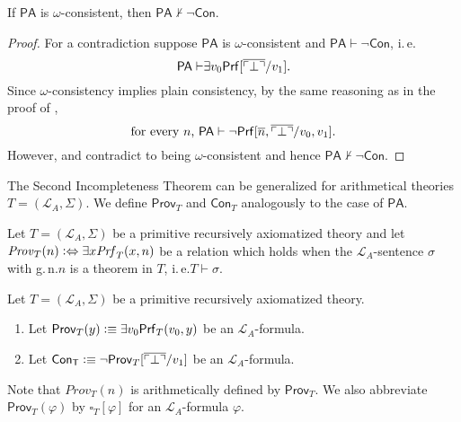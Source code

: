 \begin{cor}
If $\mathsf{PA}$ is $\omega$-consistent, then $\mathsf{PA} \nvdash \lnot \mathsf{Con}$. 
\end{cor}
\begin{proof}
For a contradiction suppose $\mathsf{PA}$ is $\omega$-consistent and $\mathsf{PA \vdash \lnot Con}$, i.\,e.\@ 
\begin{equation}\label{eq:omegain3}
\mathsf{PA \vdash} \exists v_0  \mathsf{Prf}[\overline{\ulcorner \bot \urcorner} /v_1].
\end{equation} Since $\omega$-consistency implies plain consistency, by the same reasoning as in the proof of ,
\begin{equation}\label{eq:omegain4}
\text{for every }n\text{, }\mathsf{PA
 \vdash \lnot Prf} [\overline{n}, \overline{\ulcorner \bot \urcorner} /v_0, v_1].
\end{equation} However,  and  contradict to \PA being $\omega$-consistent and hence $\mathsf{PA} \nvdash \lnot \mathsf{Con}$.
\end{proof}

The Second Incompleteness Theorem can be generalized for arithmetical theories $T = ( \mathcal{L}_A, \Sigma)$. We define $\mathsf{Prov}_T$ and $\mathsf{Con}_T$ analogously to the case of $\mathsf{PA}$.
 
\begin{dfn}
Let $T = ( \mathcal{L}_A, \Sigma)$ be a primitive recursively axiomatized theory and let $\mathit{Prov}_T(n)\vcentcolon \Leftrightarrow \exists x \mathit{Prf}_T(x,n)$ be a relation which holds when the $\mathcal{L}_A$-sentence $\sigma$ with g.\,n.\@ $n$ is a theorem in $T$, i.\,e.\@ $T \vdash \sigma$. 
\end{dfn} 


\begin{dfn}
Let $T = ( \mathcal{L}_A, \Sigma)$ be a primitive recursively axiomatized theory.
\begin{enumerate}
\item  Let $\mathsf{Prov}_T(y)\vcentcolon \equiv \exists v_0 \mathsf{ Prf}_T(v_0,y)$ be an $\mathcal{L}_A$-formula. 
\item Let $\mathsf{Con_T} \vcentcolon \equiv \mathsf{\lnot Prov}_T[\overline{\ulcorner \bot \urcorner}/v_1]$ be an $\mathcal{L}_A$-formula.
\end{enumerate}
\end{dfn}
Note that $\mathit{Prov}_T(n)$ is arithmetically defined by $\mathsf{Prov}_T$. We also abbreviate $\mathsf{Prov}_T(\varphi)$ by $\square_T[ \varphi]$ for an $\mathcal{L}_A$-formula $\varphi$. 

